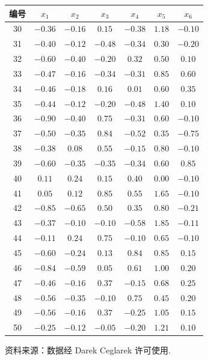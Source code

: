 \begin{mvtable}
\begin{tabular}{ccccccc}
\toprule
编号 & $x_1$ & $x_2$ & $x_3$ & $x_4$ & $x_5$ & $x_6$\\
\midrule
30 & $-0.36$ & $-0.16$ & $0.15$ & $-0.38$ & $1.18$ & $-0.10$\\
31 & $-0.40$ & $-0.12$ & $-0.48$ & $-0.34$ & $0.30$ & $-0.20$\\
32 & $-0.60$ & $-0.40$ & $-0.20$ & $0.32$ & $0.50$ & $0.10$\\
33 & $-0.47$ & $-0.16$ & $-0.34$ & $-0.31$ & $0.85$ & $0.60$\\
34 & $-0.46$ & $-0.18$ & $0.16$ & $0.01$ & $0.60$ & $0.35$\\
35 & $-0.44$ & $-0.12$ & $-0.20$ & $-0.48$ & $1.40$ & $0.10$\\
36 & $-0.90$ & $-0.40$ & $0.75$ & $-0.31$ & $0.60$ & $-0.10$\\
37 & $-0.50$ & $-0.35$ & $0.84$ & $-0.52$ & $0.35$ & $-0.75$\\
38 & $-0.38$ & $0.08$ & $0.55$ & $-0.15$ & $0.80$ & $-0.10$\\
39 & $-0.60$ & $-0.35$ & $-0.35$ & $-0.34$ & $0.60$ & $0.85$\\
40 & $0.11$ & $0.24$ & $0.15$ & $0.40$ & $0.00$ & $-0.10$\\
41 & $0.05$ & $0.12$ & $0.85$ & $0.55$ & $1.65$ & $-0.10$\\
42 & $-0.85$ & $-0.65$ & $0.50$ & $0.35$ & $0.80$ & $-0.21$\\
43 & $-0.37$ & $-0.10$ & $-0.10$ & $-0.58$ & $1.85$ & $-0.11$\\
44 & $-0.11$ & $0.24$ & $0.75$ & $-0.10$ & $0.65$ & $-0.10$\\
45 & $-0.60$ & $-0.24$ & $0.13$ & $0.84$ & $0.85$ & $0.15$\\
46 & $-0.84$ & $-0.59$ & $0.05$ & $0.61$ & $1.00$ & $0.20$\\
47 & $-0.46$ & $-0.16$ & $0.37$ & $-0.15$ & $0.68$ & $0.25$\\
48 & $-0.56$ & $-0.35$ & $-0.10$ & $0.75$ & $0.45$ & $0.20$\\
49 & $-0.56$ & $-0.16$ & $0.37$ & $-0.25$ & $1.05$ & $0.15$\\
50 & $-0.25$ & $-0.12$ & $-0.05$ & $-0.20$ & $1.21$ & $0.10$\\
\bottomrule
\end{tabular}
\end{mvtable}

资料来源：数据经 Darek Ceglarek 许可使用.

